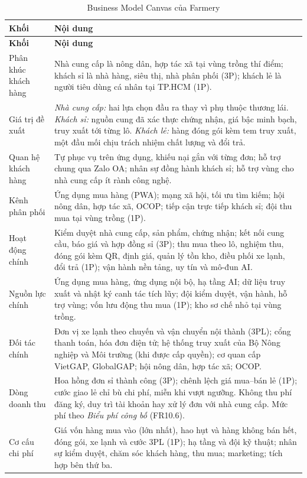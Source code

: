 \begingroup
\tblsetup
\begin{longtable}{L{2.80cm} L{12.45cm}}
\caption{Business Model Canvas của Farmery}
\label{tab:bmc} \\
\toprule
{}
\textbf{Khối} & \textbf{Nội dung} \\
\midrule
\endfirsthead
\toprule
{}
\textbf{Khối} & \textbf{Nội dung} \\
\midrule
\endhead
\bottomrule
\endfoot
Phân khúc khách hàng & Nhà cung cấp là nông dân, hợp tác xã tại vùng trồng thí điểm; khách sỉ là nhà hàng, siêu thị, nhà phân phối (3P); khách lẻ là người tiêu dùng cá nhân tại TP.HCM (1P). \\
Giá trị đề xuất & \emph{Nhà cung cấp:} hai lựa chọn đầu ra thay vì phụ thuộc thương lái. \emph{Khách sỉ:} nguồn cung đã xác thực chứng nhận, giá bậc minh bạch, truy xuất tới từng lô. \emph{Khách lẻ:} hàng đóng gói kèm tem truy xuất, một đầu mối chịu trách nhiệm chất lượng và đổi trả. \\
Quan hệ khách hàng & Tự phục vụ trên ứng dụng, khiếu nại gắn với từng đơn; hỗ trợ chung qua Zalo OA; nhân sự đồng hành khách sỉ; hỗ trợ vùng cho nhà cung cấp ít rành công nghệ. \\
Kênh phân phối & Ứng dụng mua hàng (PWA); mạng xã hội, tối ưu tìm kiếm; hội nông dân, hợp tác xã, OCOP; tiếp cận trực tiếp khách sỉ; đội thu mua tại vùng trồng (1P). \\
Hoạt động chính & Kiểm duyệt nhà cung cấp, sản phẩm, chứng nhận; kết nối cung cầu, báo giá và hợp đồng sỉ (3P); thu mua theo lô, nghiệm thu, đóng gói kèm QR, định giá, quản lý tồn kho, điều phối xe lạnh, đổi trả (1P); vận hành nền tảng, uy tín và mô-đun AI. \\
Nguồn lực chính & Ứng dụng mua hàng, ứng dụng nội bộ, hạ tầng AI; dữ liệu truy xuất và nhật ký canh tác tích lũy; đội kiểm duyệt, vận hành, hỗ trợ vùng; vốn lưu động thu mua (1P); kho sơ chế nhỏ tại vùng trồng. \\
Đối tác chính & Đơn vị xe lạnh theo chuyến và vận chuyển nội thành (3PL); cổng thanh toán, hóa đơn điện tử; hệ thống truy xuất của Bộ Nông nghiệp và Môi trường (khi được cấp quyền); cơ quan cấp VietGAP, GlobalGAP; hội nông dân, hợp tác xã; OCOP. \\
Dòng doanh thu & Hoa hồng đơn sỉ thành công (3P); chênh lệch giá mua--bán lẻ (1P); cước giao lẻ chỉ bù chi phí, miễn khi vượt ngưỡng. Không thu phí đăng ký, duy trì tài khoản hay xử lý đơn với nhà cung cấp. Mức phí theo \emph{Biểu phí công bố} (FR10.6). \\
Cơ cấu chi phí & Giá vốn hàng mua vào (lớn nhất), hao hụt và hàng không bán hết, đóng gói, xe lạnh và cước 3PL (1P); hạ tầng và đội kỹ thuật; nhân sự kiểm duyệt, chăm sóc khách hàng, thu mua; marketing; tích hợp bên thứ ba. \\
\end{longtable}
\endgroup

